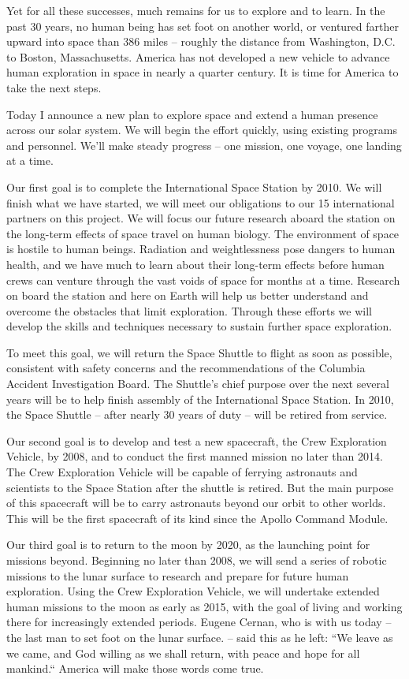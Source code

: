 \documentclass[11pt,a4paper]{article}
\begin{document}
Yet for all these successes, much remains for us to explore and to learn. In the past 30 years, no human being has set foot on another world, or ventured farther upward into space than 386 miles – roughly the distance from Washington, D.C. to Boston, Massachusetts. America has not developed a new vehicle to advance human exploration in space in nearly a quarter century. It is time for America to take the next steps.

Today I announce a new plan to explore space and extend a human presence across our solar system. We will begin the effort quickly, using existing programs and personnel. We’ll make steady progress – one mission, one voyage, one landing at a time.

Our first goal is to complete the International Space Station by 2010. We will finish what we have started, we will meet our obligations to our 15 international partners on this project. We will focus our future research aboard the station on the long-term effects of space travel on human biology. The environment of space is hostile to human beings. Radiation and weightlessness pose dangers to human health, and we have much to learn about their long-term effects before human crews can venture through the vast voids of space for months at a time. Research on board the station and here on Earth will help us better understand and overcome the obstacles that limit exploration. Through these efforts we will develop the skills and techniques necessary to sustain further space exploration.

To meet this goal, we will return the Space Shuttle to flight as soon as possible, consistent with safety concerns and the recommendations of the Columbia Accident Investigation Board. The Shuttle’s chief purpose over the next several years will be to help finish assembly of the International Space Station. In 2010, the Space Shuttle – after nearly 30 years of duty – will be retired from service.

Our second goal is to develop and test a new spacecraft, the Crew Exploration Vehicle, by 2008, and to conduct the first manned mission no later than 2014. The Crew Exploration Vehicle will be capable of ferrying astronauts and scientists to the Space Station after the shuttle is retired. But the main purpose of this spacecraft will be to carry astronauts beyond our orbit to other worlds. This will be the first spacecraft of its kind since the Apollo Command Module.

Our third goal is to return to the moon by 2020, as the launching point for missions beyond. Beginning no later than 2008, we will send a series of robotic missions to the lunar surface to research and prepare for future human exploration. Using the Crew Exploration Vehicle, we will undertake extended human missions to the moon as early as 2015, with the goal of living and working there for increasingly extended periods. Eugene Cernan, who is with us today – the last man to set foot on the lunar surface. – said this as he left: “We leave as we came, and God willing as we shall return, with peace and hope for all mankind.“ America will make those words come true.
\end{document}
